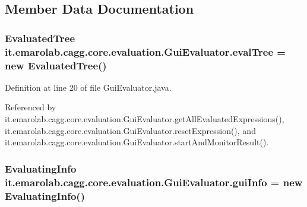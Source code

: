 \subsection{Member Data Documentation}
\hypertarget{classit_1_1emarolab_1_1cagg_1_1core_1_1evaluation_1_1GuiEvaluator_ae6546ea6dd764ba0bad50645a7f8a0aa}{
\subsubsection[{eval\-Tree}]{\setlength{\rightskip}{0pt plus 5cm}Evaluated\-Tree it.\-emarolab.\-cagg.\-core.\-evaluation.\-Gui\-Evaluator.\-eval\-Tree = new Evaluated\-Tree()\hspace{0.3cm}{\ttfamily [private]}}}\label{classit_1_1emarolab_1_1cagg_1_1core_1_1evaluation_1_1GuiEvaluator_ae6546ea6dd764ba0bad50645a7f8a0aa}


Definition at line 20 of file Gui\-Evaluator.\-java.



Referenced by it.\-emarolab.\-cagg.\-core.\-evaluation.\-Gui\-Evaluator.\-get\-All\-Evaluated\-Expressions(), it.\-emarolab.\-cagg.\-core.\-evaluation.\-Gui\-Evaluator.\-reset\-Expression(), and it.\-emarolab.\-cagg.\-core.\-evaluation.\-Gui\-Evaluator.\-start\-And\-Monitor\-Result().

\hypertarget{classit_1_1emarolab_1_1cagg_1_1core_1_1evaluation_1_1GuiEvaluator_a4b6590dbb425688e97881535bc40cc7b}{
\subsubsection[{gui\-Info}]{\setlength{\rightskip}{0pt plus 5cm}Evaluating\-Info it.\-emarolab.\-cagg.\-core.\-evaluation.\-Gui\-Evaluator.\-gui\-Info = new Evaluating\-Info()\hspace{0.3cm}{\ttfamily [private]}}}\label{classit_1_1emarolab_1_1cagg_1_1core_1_1evaluation_1_1GuiEvaluator_a4b6590dbb425688e97881535bc40cc7b}


